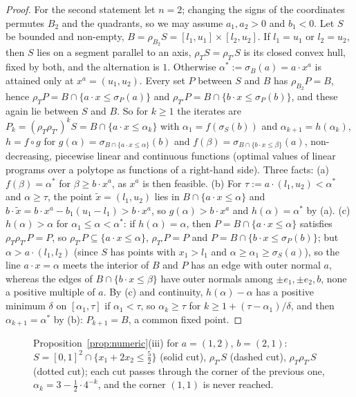 \documentclass[11pt]{amsart}
\theoremstyle{definition}
\begin{document}
\begin{proof}
For the second statement let $n=2$; changing the signs of the
coordinates permutes $B_2$ and the quadrants, so we may assume $a_1,a_2
>0$ and $b_1<0$. Let $S$ be bounded and non-empty, $B=\rho_{B_2}S=
[l_1,u_1]\times[l_2,u_2]$. If $l_1=u_1$ or $l_2=u_2$, then $S$ lies on a
segment parallel to an axis, $\rho_TS=\rho_{T'}S$ is its closed convex
hull, fixed by both, and the alternation is $1$. Otherwise $\alpha^*:=
\sigma_B(a)=a\cdot x^a$ is attained only at $x^a=(u_1,u_2)$. Every set
$P$ between $S$ and $B$ has $\rho_{B_2}P=B$, hence $\rho_TP=B\cap\{a
\cdot x\le\sigma_P(a)\}$ and $\rho_{T'}P=B\cap\{b\cdot x\le\sigma_P(b)
\}$, and these again lie between $S$ and $B$. So for $k\ge1$ the
iterates are $P_k=(\rho_T\rho_{T'})^kS=B\cap\{a\cdot x\le\alpha_k\}$
with $\alpha_1=f(\sigma_S(b))$ and $\alpha_{k+1}=h(\alpha_k)$, $h=f
\circ g$ for $g(\alpha)=
\sigma_{B\cap\{a\cdot x\le\alpha\}}(b)$ and $f(\beta)=\sigma_{B\cap\{b
\cdot x\le\beta\}}(a)$, non-decreasing, piecewise linear and continuous
functions (optimal values of linear programs over a polytope as
functions of a right-hand side). Three facts: (a) $f(\beta)=\alpha^*$ for
$\beta\ge b\cdot x^a$, as $x^a$ is then feasible. (b) For $\tau:=a\cdot
(l_1,u_2)<\alpha^*$ and $\alpha\ge\tau$, the point $\tilde x=(l_1,u_2)$
lies in $B\cap\{a\cdot x\le\alpha\}$ and $b\cdot\tilde x=b\cdot x^a-b_1
(u_1-l_1)>b\cdot x^a$, so $g(\alpha)>b\cdot x^a$ and $h(\alpha)=
\alpha^*$ by (a). (c) $h(\alpha)>\alpha$ for $\alpha_1\le\alpha<\alpha^*$:
if $h(\alpha)=\alpha$, then $P=B\cap\{a\cdot x\le\alpha\}$ satisfies
$\rho_T\rho_{T'}P=P$, so $\rho_{T'}P\subseteq\{a\cdot x\le\alpha\}$,
$\rho_{T'}P=P$ and $P=B\cap\{b\cdot x\le\sigma_P(b)\}$; but $\alpha>
a\cdot(l_1,l_2)$ (since $S$ has points with $x_1>l_1$ and $\alpha\ge
\alpha_1\ge\sigma_S(a)$), so the line $a\cdot x=\alpha$ meets the
interior of $B$ and $P$ has an edge with outer normal $a$, whereas the
edges of $B\cap\{b\cdot x\le\beta\}$ have outer normals among $\pm e_1,
\pm e_2,b$, none a positive multiple of $a$. By (c) and continuity,
$h(\alpha)-\alpha$ has a positive minimum $\delta$ on $[\alpha_1,\tau]$
if $\alpha_1<\tau$, so $\alpha_k\ge\tau$ for $k\ge1+(\tau-\alpha_1)/
\delta$, and then $\alpha_{k+1}=\alpha^*$ by (b): $P_{k+1}=B$, a common
fixed point.
\end{proof}

\begin{figure}
\centering
{}
\caption{Proposition~\ref{prop:numeric}(iii) for $a=(1,2)$, $b=(2,1)$:
$S=[0,1]^2\cap\{x_1+2x_2\le\frac52\}$ (solid cut), $\rho_{T'}S$
(dashed cut), $\rho_T\rho_{T'}S$ (dotted cut); each cut passes through
the corner of the previous one, $\alpha_k=3-\frac12\cdot4^{-k}$, and
the corner $(1,1)$ is never reached.}
\end{figure}
\end{document}
